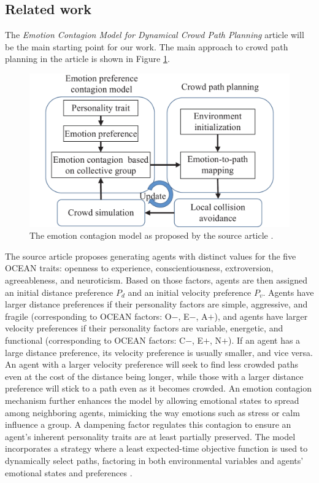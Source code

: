 \documentclass[9pt]{pnas-new}
\begin{document}
\subsection{Related work}
The \textit{Emotion Contagion Model for Dynamical Crowd Path Planning} article will be the main starting point for our work. The main approach to crowd path planning in the article is shown in Figure \ref{fig:outline}. 
\begin{figure}[h!]
    \centering
    \includegraphics[width=1\linewidth]{fig/outline.jpg}
    \caption{The emotion contagion model as proposed by the source article \cite{Wu_Huang_Tian_Yan_Yu_2024}.}
    \label{fig:outline}
\end{figure}

The source article proposes generating agents with distinct values for the five OCEAN traits: openness to experience, conscientiousness, extroversion, agreeableness, and neuroticism. Based on those factors, agents are then assigned an initial distance preference ${P_d}$ and an initial velocity preference ${P_v}$. Agents have larger distance preferences if their personality factors are simple, aggressive, and fragile (corresponding to OCEAN factors: O${-}$, E${-}$, A${+}$), and agents have larger velocity preferences if their personality factors are variable, energetic, and functional (corresponding to OCEAN factors: C${-}$, E${+}$, N${+}$). If an agent has a large distance preference, its velocity preference is usually smaller, and vice versa. An agent with a larger velocity preference will seek to find less crowded paths even at the cost of the distance being longer, while those with a larger distance preference will stick to a path even as it becomes crowded. An emotion contagion mechanism further enhances the model by allowing emotional states to spread among neighboring agents, mimicking the way emotions such as stress or calm influence a group. A dampening factor regulates this contagion to ensure an agent's inherent personality traits are at least partially preserved. The model incorporates a strategy where a least expected-time objective function is used to dynamically select paths, factoring in both environmental variables and agents’ emotional states and preferences \cite{Wu_Huang_Tian_Yan_Yu_2024}.
\end{document}
